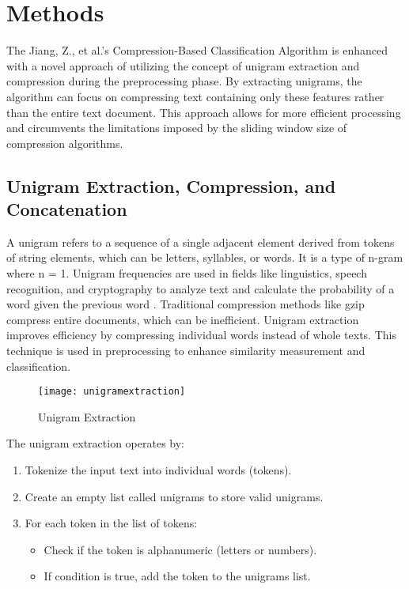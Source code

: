 \documentclass{article}
\begin{document}
\section{Methods}

The Jiang, Z., et al.'s Compression-Based Classification Algorithm is enhanced with a novel approach of utilizing the concept of unigram extraction and compression during the preprocessing phase. By extracting unigrams, the algorithm can focus on compressing text containing only these features rather than the entire text document. This approach allows for more efficient processing and circumvents the limitations imposed by the sliding window size of compression algorithms.

\subsection{Unigram Extraction, Compression, and Concatenation}

A unigram refers to a sequence of a single adjacent element derived from tokens of string elements, which can be letters, syllables, or words. It is a type of n-gram where n = 1. Unigram frequencies are used in fields like linguistics, speech recognition, and cryptography to analyze text and calculate the probability of a word given the previous word \cite{Jimoh2021}. Traditional compression methods like gzip compress entire documents, which can be inefficient. Unigram extraction improves efficiency by compressing individual words instead of whole texts. This technique is used in preprocessing to enhance similarity measurement and classification.

\begin{figure}[H]
    \centering
    \texttt{[image: unigramextraction]}
    \caption{Unigram Extraction}
    \label{fig:unigram extraction}
\end{figure}

The unigram extraction operates by: 
\begin{enumerate}
    \item Tokenize the input text into individual words (tokens).
    \item Create an empty list called unigrams to store valid unigrams.
    \item For each token in the list of tokens:
    \begin{itemize}
        \item Check if the token is alphanumeric (letters or numbers).
        \item If condition is true, add the token to the unigrams list.
    \end{itemize}
\end{enumerate}
\end{document}
